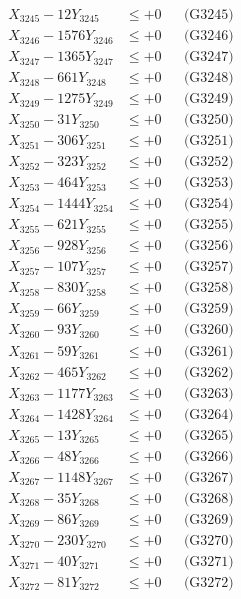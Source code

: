 \documentclass[a4paper,10pt]{article}
\begin{document}
{\begin{align}
X_{3245} - 12Y_{3245} &\leq +0 && \text{(G3245)} \\
X_{3246} - 1576Y_{3246} &\leq +0 && \text{(G3246)} \\
X_{3247} - 1365Y_{3247} &\leq +0 && \text{(G3247)} \\
X_{3248} - 661Y_{3248} &\leq +0 && \text{(G3248)} \\
X_{3249} - 1275Y_{3249} &\leq +0 && \text{(G3249)} \\
X_{3250} - 31Y_{3250} &\leq +0 && \text{(G3250)} \\
\allowbreak
X_{3251} - 306Y_{3251} &\leq +0 && \text{(G3251)} \\
X_{3252} - 323Y_{3252} &\leq +0 && \text{(G3252)} \\
X_{3253} - 464Y_{3253} &\leq +0 && \text{(G3253)} \\
X_{3254} - 1444Y_{3254} &\leq +0 && \text{(G3254)} \\
X_{3255} - 621Y_{3255} &\leq +0 && \text{(G3255)} \\
X_{3256} - 928Y_{3256} &\leq +0 && \text{(G3256)} \\
X_{3257} - 107Y_{3257} &\leq +0 && \text{(G3257)} \\
X_{3258} - 830Y_{3258} &\leq +0 && \text{(G3258)} \\
X_{3259} - 66Y_{3259} &\leq +0 && \text{(G3259)} \\
X_{3260} - 93Y_{3260} &\leq +0 && \text{(G3260)} \\
\allowbreak
X_{3261} - 59Y_{3261} &\leq +0 && \text{(G3261)} \\
X_{3262} - 465Y_{3262} &\leq +0 && \text{(G3262)} \\
X_{3263} - 1177Y_{3263} &\leq +0 && \text{(G3263)} \\
X_{3264} - 1428Y_{3264} &\leq +0 && \text{(G3264)} \\
X_{3265} - 13Y_{3265} &\leq +0 && \text{(G3265)} \\
X_{3266} - 48Y_{3266} &\leq +0 && \text{(G3266)} \\
X_{3267} - 1148Y_{3267} &\leq +0 && \text{(G3267)} \\
X_{3268} - 35Y_{3268} &\leq +0 && \text{(G3268)} \\
X_{3269} - 86Y_{3269} &\leq +0 && \text{(G3269)} \\
X_{3270} - 230Y_{3270} &\leq +0 && \text{(G3270)} \\
\allowbreak
X_{3271} - 40Y_{3271} &\leq +0 && \text{(G3271)} \\
X_{3272} - 81Y_{3272} &\leq +0 && \text{(G3272)} \\

\end{align}}
\end{document}

